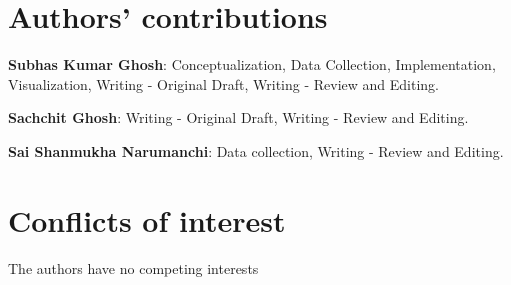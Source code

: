 \documentclass[preprint,authoryear,12pt]{elsarticle}
\begin{document}
	\section{Authors' contributions}
	
	\textbf{Subhas Kumar Ghosh}: Conceptualization, Data Collection, Implementation, Visualization, Writing - Original Draft, Writing - Review and Editing.
	
	\textbf{Sachchit Ghosh}: Writing - Original Draft, Writing - Review and Editing.
	
	\textbf{Sai Shanmukha Narumanchi}: Data collection, Writing - Review and Editing.
	
	\section{Conflicts of interest}
	The authors have no competing interests
	
	
	
		
\end{document}
